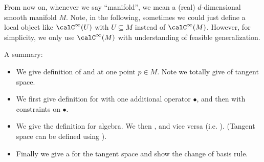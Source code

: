 \documentclass{article}
\begin{document}
From now on, whenever we say ``manifold'', we mean a (real) $d$-dimensional smooth manifold $M$. Note, in the following, sometimes we could just define a local object like $\calC^\infty(U)$ with $U\subseteq M$ instead of $\calC^\infty(M)$. However, for simplicity, we only use $\calC^\infty(M)$ with understanding of feasible generalization.

A summary:
\begin{itemize}[$\blacktriangleright$]
\item We give definition of  and   at one point $p\in M$. Note we totally give  of tangent space.
    \item  We first give definition for  with one additional operator $\bullet$, and then  with constraints on $\bullet$. 
    \item We give the definition  for algebra. We then , and vice versa (i.e. ). (Tangent space can be defined using ).
    \item Finally we give a  for the tangent space and show the change of basis rule. 
\end{itemize}
\end{document}
